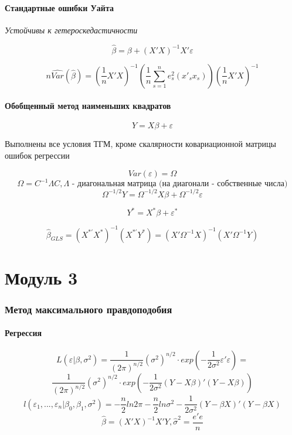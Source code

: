 \documentclass[a4paper, 12pt]{article}
\begin{document}
\subsection{Стандартные ошибки Уайта}

\begin{center}
    \textit{Устойчивы к гетероскедастичности}
\end{center}

\[\hat{\beta} = \beta + (X'X)^{-1}X'\varepsilon\]

\[n\hat{Var}(\hat{\beta}) = (\frac{1}{n}X'X)^{-1} (\frac{1}{n}\sum_{s = 1}^{n}e_{s}^{2} (x'_{s}x_{s}))(\frac{1}{n}X'X)^{-1}\]

\subsection{Обобщенный метод наименьших квадратов}

\[Y = X\beta + \varepsilon\]

Выполнены все условия ТГМ, кроме скалярности ковариационной матрицы ошибок регрессии

\[Var(\varepsilon) = \Omega\]
\[\Omega = C^{-1}\Lambda C, \Lambda \textrm{ - диагональная матрица (на диагонали - собственные числа)}\]
\[\Omega^{-1/2}Y = \Omega^{-1/2}X\beta + \Omega^{-1/2}\varepsilon\]

\[Y^{*} = X^{*}\beta + \varepsilon^{*}\]

\[\hat{\beta}_{GLS} = (X^{* \prime}X^{*})^{-1}(X^{*\prime}Y^{*}) = (X'\Omega^{-1} X)^{-1}(X'\Omega^{-1} Y)\]
\newpage

\part{Модуль 3}

\section{Метод максимального правдоподобия}

\subsection{Регрессия}

\[L(\varepsilon|\beta, \sigma^{2}) = \frac{1}{(2\pi)^{n/2}}(\sigma^{2})^{n/2} \cdot exp\left(-\frac{1}{2\sigma^{2}}\varepsilon'\varepsilon\right)=\]
\[\frac{1}{(2\pi)^{n/2}}(\sigma^{2})^{n/2} \cdot exp\left(-\frac{1}{2\sigma^{2}}(Y - X\beta)'(Y - X\beta)\right)\]
\[l(\varepsilon_{1}, ..., \varepsilon_{n}|\beta_{0}, \beta_{1}, \sigma^{2}) = -\frac{n}{2}ln2\pi-\frac{n}{2}ln\sigma^{2}-\frac{1}{2\sigma^{2}}(Y - \beta X)'(Y - \beta X)\]
\[\hat{\beta} = (X'X)^{-1}X'Y, \hat{\sigma}^{2} = \frac{e'e}{n}\]
\end{document}
